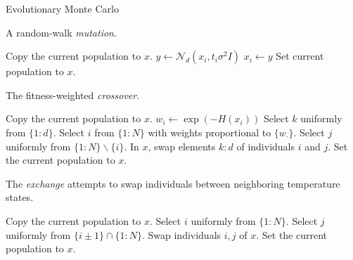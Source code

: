 \documentclass[12pt]{article}\usepackage[]{graphicx}\usepackage[]{color}
\begin{document}
\begin{algorithm}
  \caption{Evolutionary Monte Carlo}
  \label{alg:emc}
  \footnotesize
  \begin{algorithmic}
     
    \State {}
    \Ow 
    \State {}
    \EndWp
    \State  {}
    \EndProcedure
  \end{algorithmic}
\end{algorithm}


\begin{algorithm}
  \caption{A random-walk \emph{mutation}.}
  \label{alg:mutate}
  \footnotesize
  \begin{algorithmic}
    \State Copy the current population to $x$.
    \State $y \gets \mathcal N_d(x_i,t_i \sigma^2I)$
    \State $x_i \gets y$
    \EndWp
    \EndFor
    \State Set current population to $x$.
    \EndProcedure
  \end{algorithmic}
\end{algorithm}

\begin{algorithm}
  \caption{The fitness-weighted \emph{crossover}.}
  \label{alg:crossover}
  \footnotesize
  \begin{algorithmic}
    \State Copy the current population to $x$.
    \State $w_i \gets \exp(-H(x_i))$
    \EndFor
    \State Select $k$ uniformly from $\{1\colon d\}.$
    \State Select $i$ from $\{1\colon N\}$ with weights proportional
    to $\{w_\cdot\}$.
    \State Select $j$ uniformly from $\{1\colon N\} \backslash \{i\}.$ 
    \State In $x$, swap elements $k\colon d$ of individuals $i$ and $j$.
    \State  Set the  current population to $x$.
    \EndWp
    \EndProcedure
  \end{algorithmic}
\end{algorithm}

\begin{algorithm}
  \caption{The \emph{exchange} attempts to swap individuals between
    neighboring temperature states.}
  \label{alg:exchange}
  \footnotesize
  \begin{algorithmic}
    \State Copy the current population to $x$.
    \State Select $i$ uniformly from $\{1\colon N\}$. 
    \State Select $j$ uniformly from $\{i\pm 1\}\cap\{1\colon N\}$.
    \State Swap individuals $i,j$ of $x$.
    \State Set the current population to $x$.
    \EndWp
    \EndProcedure
  \end{algorithmic}
\end{algorithm}
\end{document}
